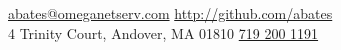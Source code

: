 
\par{\bigskip\par} %
\href{mailto:abates@omeganetserv.com}{abates@omeganetserv.com} \hfill \href{http://github.com/abates}{http://github.com/abates}\\
4 Trinity Court, Andover, MA 01810 \hfill \href{tel:7192001191}{719 200 1191}\\

